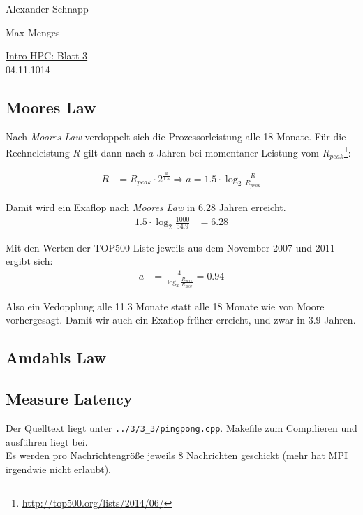 \documentclass[a4paper,11pt]{scrartcl}
\begin{document}
\hfill Alexander Schnapp

\hfill Max Menges

\begin{center}
\underline{\Huge{Intro HPC: Blatt 3}}\\
\large{04.11.1014}\\
\end{center}


\subsection{Moores Law}
Nach \emph{Moores Law} verdoppelt sich die Prozessorleistung alle 18 Monate. Für die Rechneleistung $R$ gilt dann nach $a$ Jahren bei momentaner Leistung vom $R_{peak}$\footnote{\url{http://top500.org/lists/2014/06/}}:

\begin{align*}
R&=R_{peak}\cdot 2^{\frac{a}{1.5}} \Rightarrow a = 1.5\cdot \log_2{\frac{R}{R_{peak}}}
\end{align*}

Damit wird ein Exaflop nach \emph{Moores Law} in 6.28 Jahren erreicht.
\begin{align*}
1.5\cdot \log_2{\frac{1000}{54.9}}&=6.28
\end{align*}

Mit den Werten der TOP500 Liste jeweils aus dem November 2007 und 2011 ergibt sich:
\begin{align*}
    a&= \frac{4}{\log_2{\frac{R_{2011}}{R_{2007}}}}=0.94
\end{align*}

Also ein Vedopplung alle 11.3 Monate statt alle 18 Monate wie von Moore vorhergesagt. Damit wir auch ein Exaflop früher erreicht, und zwar in 3.9 Jahren.\\

\subsection{Amdahls Law}

\subsection{Measure Latency}

Der Quelltext liegt unter \verb+../3/3_3/pingpong.cpp+. Makefile zum Compilieren und ausführen liegt bei. \\

Es werden pro Nachrichtengröße jeweils 8 Nachrichten geschickt (mehr hat MPI irgendwie nicht erlaubt). 
\end{document}
